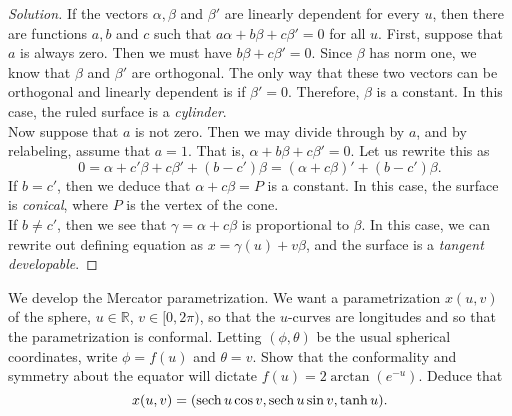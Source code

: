 \documentclass[Shifrin_Solutions_Spring_2015]{subfiles}
\begin{document}
\begin{proof}[Solution] If the vectors $\alpha, \beta$ and $\beta'$ are linearly dependent for every $u$, then there are functions $a, b$ and $c$ such that $a\alpha + b\beta + c\beta' =0$ for all $u$.
First, suppose that $a$ is always zero. Then we must have $b\beta+c\beta' = 0$. Since $\beta$ has norm one, we know that $\beta$ and $\beta'$ are orthogonal. The only way that these two vectors can be orthogonal and linearly dependent is if $\beta' = 0$. Therefore, $\beta$ is a constant. In this case, the ruled surface is a \emph{cylinder}.\\

Now suppose that $a$ is not zero. Then we may divide through by $a$, and by relabeling, assume that $a=1$. That is, $\alpha + b\beta +c\beta' = 0$. Let us rewrite this as
\[
0 = \alpha + c'\beta + c\beta' + (b-c')\beta = \left(\alpha + c\beta\right)' + (b-c')\beta.
\]
If $b=c'$, then we deduce that $\alpha+c\beta=P$ is a constant. In this case, the surface is \emph{conical}, where $P$ is the vertex of the cone. \\
If $b\neq c'$, then we see that $\gamma=\alpha+c\beta$ is proportional to $\beta$. In this case, we can rewrite out defining equation as $x = \gamma(u) + v \beta$, and the surface is a \emph{tangent developable}.
\end{proof}


\begin{exercise} We develop the Mercator parametrization. We want a parametrization $x(u,v)$ of the sphere, $u\in \mathbb{R}$, $v \in [0, 2\pi)$, so that the $u$-curves are longitudes and so that the parametrization is conformal. Letting $(\phi, \theta)$ be the usual spherical coordinates, write $\phi = f(u)$ and $\theta = v$. Show that the conformality and symmetry about the equator will dictate $f(u) = 2\arctan(e^{-u})$. Deduce that
\[
x(u,v) = ( \operatorname{\mathrm{sech}} u \cos v , \operatorname{\mathrm{sech}} u \sin v , \tanh u ) .
\]
\end{exercise}

\begin{exercise}

\end{exercise}

\begin{exercise}

\end{exercise}

\begin{exercise}

\end{exercise}

\begin{exercise}

\end{exercise}
\end{document}
